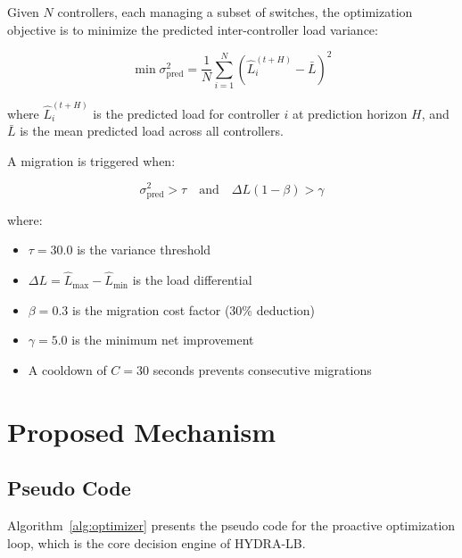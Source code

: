 \documentclass[12pt,a4paper]{report}
\begin{document}
Given $N$ controllers, each managing a subset of switches, the optimization objective is to minimize the predicted inter-controller load variance:

\begin{equation}
\min \sigma^2_{\text{pred}} = \frac{1}{N} \sum_{i=1}^{N} (\hat{L}_i^{(t+H)} - \bar{L})^2
\label{eq:variance}
\end{equation}

\noindent where $\hat{L}_i^{(t+H)}$ is the predicted load for controller $i$ at prediction horizon $H$, and $\bar{L}$ is the mean predicted load across all controllers.

A migration is triggered when:

\begin{equation}
\sigma^2_{\text{pred}} > \tau \quad \text{and} \quad \Delta L(1 - \beta) > \gamma
\label{eq:migration_condition}
\end{equation}

\noindent where:
\begin{itemize}
    \item $\tau = 30.0$ is the variance threshold
    \item $\Delta L = \hat{L}_{\max} - \hat{L}_{\min}$ is the load differential
    \item $\beta = 0.3$ is the migration cost factor (30\% deduction)
    \item $\gamma = 5.0$ is the minimum net improvement
    \item A cooldown of $C = 30$ seconds prevents consecutive migrations
\end{itemize}

\chapter{Proposed Mechanism}

\section{Pseudo Code}

Algorithm~\ref{alg:optimizer} presents the pseudo code for the proactive optimization loop, which is the core decision engine of HYDRA-LB.
\end{document}
